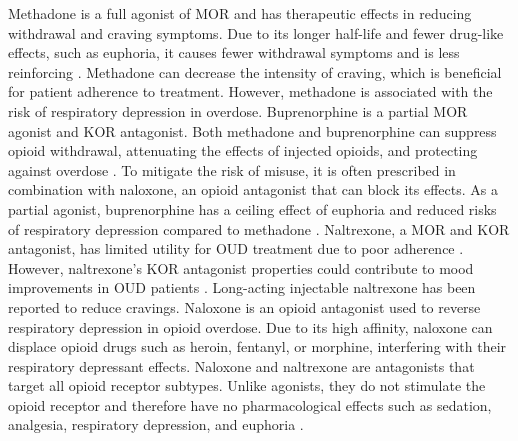 \documentclass[10pt]{article}
\begin{document}
		Methadone is a full agonist of MOR and has therapeutic effects in reducing withdrawal and craving symptoms. Due to its longer half-life and fewer drug-like effects, such as euphoria, it causes fewer withdrawal symptoms and is less reinforcing \cite{brown2004methadone}. Methadone can decrease the intensity of craving, which is beneficial for patient adherence to treatment. However, methadone is associated with the risk of respiratory depression in overdose. Buprenorphine is a partial MOR agonist and KOR antagonist. Both methadone and buprenorphine can suppress opioid withdrawal, attenuating the effects of injected opioids, and protecting against overdose \cite{bell2014pharmacological}. To mitigate the risk of misuse, it is often prescribed in combination with naloxone, an opioid antagonist that can block its effects. As a partial agonist, buprenorphine has a ceiling effect of euphoria and reduced risks of respiratory depression compared to methadone \cite{mattick2014buprenorphine}. Naltrexone, a MOR and KOR antagonist, has limited utility for OUD treatment due to poor adherence \cite{morgan2018injectable}. However, naltrexone's KOR antagonist properties could contribute to mood improvements in OUD patients \cite{weerts2008differences}. Long-acting injectable naltrexone has been reported to reduce cravings. Naloxone is an opioid antagonist used to reverse respiratory depression in opioid overdose. Due to its high affinity, naloxone can displace opioid drugs such as heroin, fentanyl, or morphine, interfering with their respiratory depressant effects. Naloxone and naltrexone are antagonists that target all opioid receptor subtypes. Unlike agonists, they do not stimulate the opioid receptor and therefore have no pharmacological effects such as sedation, analgesia, respiratory depression, and euphoria \cite{mclellan2000drug}.
		
		
		
\end{document}
